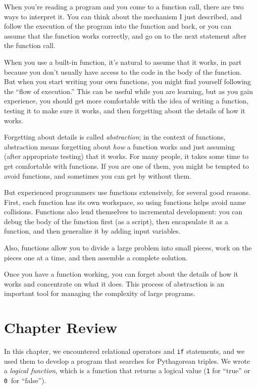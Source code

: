 When you're reading a program and you come to a function call,
there are two ways to interpret it. You can think about the mechanism I just described,
and follow the execution of the program into the function and back, or you can assume that the function works correctly, and go on to the next statement after the function call.

When you use a built-in function, it's natural to assume that it works, in part because you don't
usually have access to the code in the body of the function.
But when you start writing your own functions, you might
find yourself following the ``flow of execution.''  This can
be useful while you are learning, but as you gain experience, you
should get more comfortable with the idea of writing a function,
testing it to make sure it works, and then forgetting about the
details of how it works.


Forgetting about details is called \emph{abstraction}; in the context
of functions, abstraction means forgetting about \emph{how} a function
works and just assuming (after appropriate testing) that it works.
For many people, it takes some time to get comfortable with functions.  If you are one of them, you might be tempted to avoid functions, and sometimes you can get by without them.

But experienced programmers use functions extensively, for several good reasons. First, each function has its own workspace, so using functions helps
avoid name collisions. 
Functions also lend themselves to incremental development: you can
debug the body of the function first (as a script), then encapsulate
it as a function, and then generalize it by adding input variables.

Also, functions allow you to divide a large problem into small
pieces, work on the pieces one at a time, and then assemble a
complete solution. 

Once you have a function working, you can forget about the
details of how it works and concentrate on what it does.  This
process of abstraction is an important tool for managing the
complexity of large programs.


\section{Chapter Review}

In this chapter, we encountered relational operators and \lstinline{if} statements, and we used them to develop a program that searches for Pythagorean triples.
We wrote a \emph{logical function}, which is a function that returns a logical value
(\lstinline{1} for ``true'' or \lstinline{0}~for ``false'').

